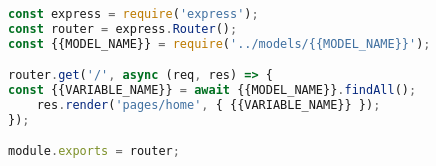 \begin{lstlisting}[language=Javascript,caption={Contoh Aset Statis}]
const express = require('express');
const router = express.Router();
const {{MODEL_NAME}} = require('../models/{{MODEL_NAME}}');

router.get('/', async (req, res) => {
const {{VARIABLE_NAME}} = await {{MODEL_NAME}}.findAll();
    res.render('pages/home', { {{VARIABLE_NAME}} });
});

module.exports = router;
\end{lstlisting}
